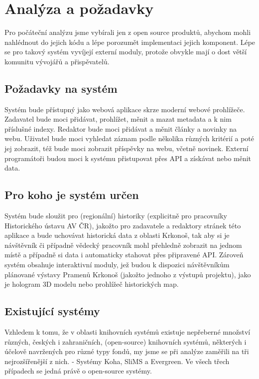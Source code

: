 \chapter{Analýza a požadavky}
Pro počáteční analýzu jsme vybírali jen z open source produktů, abychom mohli nahlédnout
do jejich kódu a lépe porozumět implementaci jejich komponent.
Lépe se pro takový systém vyvíjejí externí moduly, protože
obvykle mají o dost větší komunitu vývojářů a přispěvatelů.


\section{Požadavky na systém}
Systém bude přístupný jako webová aplikace skrze moderní webové prohlížeče.
Zadavatel bude moci přidávat, prohlížet, měnit a mazat metadata a k nim příslušné indexy.
Redaktor bude moci přidávat a měnit články a novinky na webu.
Uživatel bude moci vyhledat záznam podle několika různých kritérií a poté jej zobrazit,
též bude moci zobrazit příspěvky na webu, včetně novinek.
Externí programátoři budou moci k systému přistupovat přes API a získávat nebo měnit data. 


\section{Pro koho je systém určen}
Systém bude sloužit pro (regionální) historiky (explicitně pro pracovníky 
Historického ústavu AV ČR), jakožto pro zadavatele
a redaktory stránek této aplikace a bude uchovávat historická data z oblasti Krkonoš,
tak aby si je návštěvník či případně vědecký pracovník mohl přehledně
zobrazit na jednom místě a případně si data i automaticky stahovat přes připravené API.
Zároveň systém obsahuje interaktivní moduly, jež budou k dispozici
návštěvníkům plánované výstavy Pramenů Krkonoš (jakožto jednoho z výstupů
projektu), jako je hologram 3D modelu nebo prohlížeč historických map.

\clearpage
\section{Existující systémy}
Vzhledem k tomu, že v oblasti knihovních systémů existuje nepřeberné
množství různých, českých i zahraničních, (open-source) knihovních
systémů, některých i účelově navržených pro různé typy fondů, my jsme
se při analýze zaměřili na tři nejrozšířenější z nich. - Systémy Koha,
SliMS a Evergreen.
Ve všech třech případech se jedná právě o open-source systémy.


